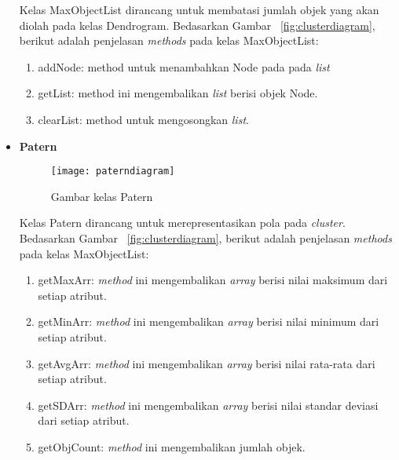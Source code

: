 \begin{itemize}
Kelas MaxObjectList dirancang untuk membatasi jumlah objek yang akan diolah pada kelas Dendrogram. Bedasarkan Gambar ~\ref{fig:clusterdiagram}, berikut adalah penjelasan \textit{methods} pada kelas MaxObjectList:

\begin{enumerate}

\item addNode: method untuk menambahkan Node pada pada \textit{list}

\item getList: method ini mengembalikan \textit{list} berisi objek Node.

\item clearList: method untuk mengosongkan \textit{list}.\\
\end{enumerate}

\item \textbf{Patern}\\

\begin{figure}[H]
    \centering  
    \texttt{[image: paterndiagram]}  
    \caption[Gambar kelas Patern]{Gambar kelas Patern} 
    \label{fig:paterndiagram} 
\end{figure}

Kelas Patern dirancang untuk merepresentasikan pola pada \textit{cluster}. Bedasarkan Gambar ~\ref{fig:clusterdiagram}, berikut adalah penjelasan \textit{methods} pada kelas MaxObjectList:

\begin{enumerate}

\item getMaxArr: \textit{method} ini mengembalikan \textit{array} berisi nilai maksimum dari setiap atribut.

\item getMinArr: \textit{method} ini mengembalikan \textit{array} berisi nilai minimum dari setiap atribut.

\item getAvgArr: \textit{method} ini mengembalikan \textit{array} berisi nilai rata-rata dari setiap atribut.

\item getSDArr: \textit{method} ini mengembalikan \textit{array} berisi nilai standar deviasi dari setiap atribut.

\item getObjCount: \textit{method} ini mengembalikan jumlah objek.\\
 

\end{enumerate}
\end{itemize}
